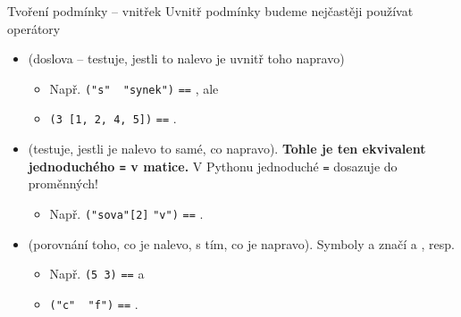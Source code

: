 \begin{frame}{Tvoření podmínky -- vnitřek}
  Uvnitř podmínky budeme nejčastěji používat operátory
  \begin{itemize}
   \item<1-> \texttt{} (doslova  -- testuje, jestli to nalevo je
    uvnitř toho napravo)
    \begin{itemize}
     \item Např. \texttt{("s"}~\texttt{ "synek")} \texttt{==}
      \texttt{}, ale
     \item \texttt{(3  [1, 2, 4, 5])} \texttt{==} \texttt{}.
    \end{itemize}
   \item<2-> \texttt{\mlb{==}} (testuje, jestli je nalevo to samé, co napravo).
    \textbf{Tohle je ten ekvivalent jednoduchého \texttt{=} v matice.} V Pythonu
    jednoduché \texttt{=} dosazuje do proměnných!
    \begin{itemize}
     \item Např. \texttt{("sova"[2]} \texttt{\mlb{==}} \texttt{"v")} \texttt{==}
      \texttt{}.
    \end{itemize}
   \item<3-> \texttt{\mlb{<,>,<=,>=}} (porovnání toho, co je nalevo, s tím, co
    je napravo). Symboly \texttt{\mlb{<=}} a \texttt{\mlb{>=}} značí  a , resp.
    \begin{itemize}
     \item Např. \texttt{(5 \mlb{>} 3)} \texttt{==} \texttt{} a
     \item \texttt{("c"~\mlb{<=} "f")} \texttt{==} \texttt{}.
    \end{itemize}
  \end{itemize}
\end{frame}

